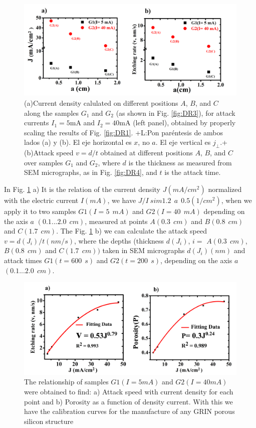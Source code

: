 \documentclass{article}
\newcommand{\notaL}[1]{{\color{blue}+L:#1+}}
\begin{document}
\begin{figure}
  \centering
   \includegraphics[width=\textwidth]{Images/grinJDR}
  \caption{(a)Current density calulated on different positions
    $A$, $B$, and $C$ along the samples $G_1$ and $G_2$ (as shown in
    Fig. \ref{fig:DR3}), for attack currents $I_1=5\text{mA}$ and
    $I_2=40\text{mA}$ (left panel), obtained by properly scaling the
    results of Fig. \ref{fig:DR1}. \notaL{Pon paréntesis de ambos
      lados (a) y (b). El eje horizontal es $x$, no $a$. El eje
      vertical es $j_\perp$.}
    (b)Attack speed $v=d/t$ obtained at different positions $A$, $B$,
    and $C$ over samples $G_1$ and $G_2$, where $d$ is the thickness
    as measured from SEM micrographs, as in Fig. \ref{fig:DR4},
    and $t$ is the attack time.}
  \label{fig:JDR}
\end{figure}
In Fig. \ref{fig:JDR} a) It is the relation of the current density $ J
(mA / cm ^ 2) $ normalized with the electric current $ I (mA) $, we
have $ J / I \ sim 1.2 \ \ a \ \ 0.5 (1 / cm ^ 2) $, when we apply it
to two samples $ G1 (I = 5 \ \ mA) $ and $ G2 (I = 40 \ \ mA) $
depending on the axis $ a $ $ (0.1 ... 2.0 \ \ cm) $, measured at
points $ A (0.3 \ \ cm) $ and $ B (0.8 \ \ cm) $ and $ C (1.7 \ \ cm)
$.
The Fig. \ref{fig:JDR} b) we can calculate the attack speed $ v = d
(J_i) / t (nm / s) $, where the depths (thickness $ d (J_i) $, $ i = $
$ A (0.3 \ \ cm) $, $ B (0.8 \ \ cm) $ and $ C (1.7 \ \ cm)) $ taken
in SEM micrographs $ d (J_i) (nm) $ and attack times $ G1 (t = 600 \ \
s) $ and $ G2 (t = 200 \ \ s) $, depending on the axis $ a $ $ (0.1
... 2.0 \ \ cm) $.
\begin{figure}
  \centering
  \includegraphics[width=\textwidth]{Images/grinJD31}
  \caption{The relationship of samples $ G1 (I = 5 mA) $ and $
      G2 (I = 40 mA) $ were obtained to find: a) Attack speed with
      current density for each point and b) Porosity as a function of
      density current. With this we have the calibration curves for
      the manufacture of any GRIN porous silicon structure   }
  \label{fig:Indr1}
\end{figure}
\end{document}
